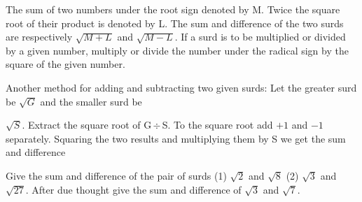 \documentclass[]{article}
\begin{document}
{{{\begin{quote}  {
}  \end{quote}
\vspace{-4mm}

{The sum of two numbers under the root sign denoted by M. Twice the
square root of their product is denoted by L. The sum and difference of
the two surds are respectively $\sqrt{{M+L}}$ and $\sqrt{M-L}$}. If a surd is to be multiplied or divided by a given number, multiply or
divide the number under the radical sign by the square of the given
number.

{Another method for adding and subtracting two given surds: Let the
greater surd be }$\sqrt{G}$ and the smaller surd be }$\sqrt{S}$. Extract the
square root of G\,$\div$\,S. To the square root add $+1$ and $-1$ separately.
Squaring the two results and multiplying them by S we get the sum and
difference 
}
\newpage
\large


\begin{quote}  {}  
\end{quote}

{Give the sum and difference of the pair of surds (1) $\sqrt{2}$ and $\sqrt{8}$
(2) $\sqrt{3}$ and $\sqrt{27}$. After due thought give the sum and difference of
$\sqrt{3}$ and $\sqrt{7}$.}

\begin{quote}  {
}  \end{quote}

}
\end{document}
